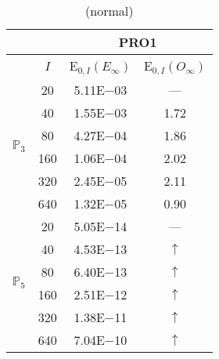 \begin{table}[H]
\caption{(normal)}
\setlength{\tabcolsep}{5pt}
\centering
\begin{tabular}{@{}l c c c@{}}
\toprule
 &  & \multicolumn{2}{c}{PRO1}\\
\midrule
 & $I$ & E$_{0,I}(E_{\infty})$ & E$_{0,I}(O_{\infty})$\\
\midrule
\multirow{6}{*}{$\mathbb{P}_{3}$}
 & 20 & 5.11E$-$03 & ---\\
 & 40 & 1.55E$-$03 & 1.72\\
 & 80 & 4.27E$-$04 & 1.86\\
 & 160 & 1.06E$-$04 & 2.02\\
 & 320 & 2.45E$-$05 & 2.11\\
 & 640 & 1.32E$-$05 & 0.90\\
\midrule
\multirow{6}{*}{$\mathbb{P}_{5}$}
 & 20 & 5.05E$-$14 & ---\\
 & 40 & 4.53E$-$13 & $\uparrow$\\
 & 80 & 6.40E$-$13 & $\uparrow$\\
 & 160 & 2.51E$-$12 & $\uparrow$\\
 & 320 & 1.38E$-$11 & $\uparrow$\\
 & 640 & 7.04E$-$10 & $\uparrow$\\
\bottomrule
\end{tabular}
\label{Table:PRO:test_01_01_test48_pro1}
\end{table}

